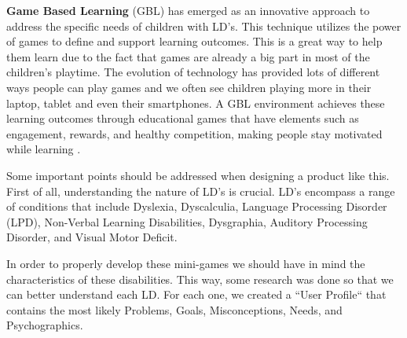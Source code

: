 \textbf{Game Based Learning} (GBL) has emerged as an innovative approach to address the specific needs of children with LD's. This technique utilizes the power of games to define and support learning outcomes. This is a great way to help them learn due to the fact that games are already a big part in most of the children's playtime. The evolution of technology has provided lots of different ways people can play games and we often see children playing more in their laptop, tablet and even their smartphones. A GBL environment achieves these learning outcomes through educational games that have elements such as engagement, rewards, and healthy competition, making people stay motivated while learning \cite{gblProsCons}.


Some important points should be addressed when designing a product like this. First of all, understanding the nature of LD's is crucial. LD's encompass a range of conditions that include Dyslexia, Dyscalculia, Language Processing Disorder (LPD), Non-Verbal Learning Disabilities, Dysgraphia, Auditory Processing Disorder, and Visual Motor Deficit.

In order to properly develop these mini-games we should have in mind the characteristics of these disabilities. This way, some research was done so that we can better understand each LD. For each one, we created a ``User Profile`` that contains the most likely Problems, Goals, Misconceptions, Needs, and Psychographics.